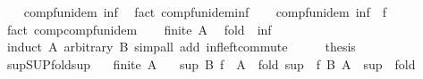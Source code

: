 \begin{isabellebody}
\ \ \isamarkupfalse%
\ comp{\isacharunderscore}{\kern0pt}fun{\isacharunderscore}{\kern0pt}idem\ inf\ \isamarkupfalse%
\ {\isacharparenleft}{\kern0pt}fact\ comp{\isacharunderscore}{\kern0pt}fun{\isacharunderscore}{\kern0pt}idem{\isacharunderscore}{\kern0pt}inf{\isacharparenright}{\kern0pt}\isanewline
\ \ \isamarkupfalse%
\ comp{\isacharunderscore}{\kern0pt}fun{\isacharunderscore}{\kern0pt}idem\ {\isachardoublequoteopen}inf\ {\isasymcirc}\ f{\isachardoublequoteclose}\ \isamarkupfalse%
\ {\isacharparenleft}{\kern0pt}fact\ comp{\isacharunderscore}{\kern0pt}comp{\isacharunderscore}{\kern0pt}fun{\isacharunderscore}{\kern0pt}idem{\isacharparenright}{\kern0pt}\isanewline
\ \ \isamarkupfalse%
\ {\isacartoucheopen}finite\ A{\isacartoucheclose}\ \isamarkupfalse%
\ {\isachardoublequoteopen}{\isacharquery}{\kern0pt}fold\ {\isacharequal}{\kern0pt}\ {\isacharquery}{\kern0pt}inf{\isachardoublequoteclose}\isanewline
\ \ \ \ \isamarkupfalse%
\ {\isacharparenleft}{\kern0pt}induct\ A\ arbitrary{\isacharcolon}{\kern0pt}\ B{\isacharparenright}{\kern0pt}\ {\isacharparenleft}{\kern0pt}simp{\isacharunderscore}{\kern0pt}all\ add{\isacharcolon}{\kern0pt}\ inf{\isacharunderscore}{\kern0pt}left{\isacharunderscore}{\kern0pt}commute{\isacharparenright}{\kern0pt}\isanewline
\ \ \isamarkupfalse%
\ \isamarkupfalse%
\ {\isacharquery}{\kern0pt}thesis\ \isacommand{{\isachardot}{\kern0pt}{\isachardot}{\kern0pt}}\isamarkupfalse%
\isanewline
{}\isamarkupfalse%
%
\endisatagproof
{\isafoldproof}%
%
\isadelimproof
\isanewline
%
\endisadelimproof
\isanewline
{}\isamarkupfalse%
\ sup{\isacharunderscore}{\kern0pt}SUP{\isacharunderscore}{\kern0pt}fold{\isacharunderscore}{\kern0pt}sup{\isacharcolon}{\kern0pt}\isanewline
\ \ \ {\isachardoublequoteopen}finite\ A{\isachardoublequoteclose}\isanewline
\ \ \ {\isachardoublequoteopen}sup\ B\ {\isacharparenleft}{\kern0pt}{\isasymSqunion}{\isacharparenleft}{\kern0pt}f\ {\isacharbackquote}{\kern0pt}\ A{\isacharparenright}{\kern0pt}{\isacharparenright}{\kern0pt}\ {\isacharequal}{\kern0pt}\ fold\ {\isacharparenleft}{\kern0pt}sup\ {\isasymcirc}\ f{\isacharparenright}{\kern0pt}\ B\ A{\isachardoublequoteclose}\ {\isacharparenleft}{\kern0pt}\ {\isachardoublequoteopen}{\isacharquery}{\kern0pt}sup\ {\isacharequal}{\kern0pt}\ {\isacharquery}{\kern0pt}fold{\isachardoublequoteclose}{\isacharparenright}{\kern0pt}\isanewline
%
\isadelimproof

\end{isabellebody}

